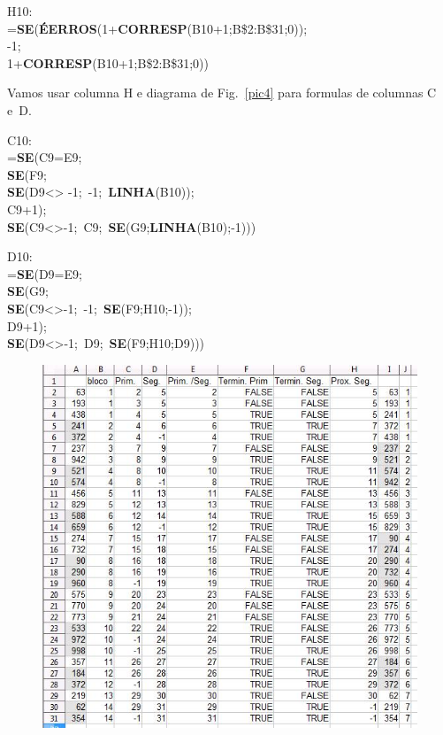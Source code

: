 \documentclass[12pt]{article}
\begin{document}
\noindent
H10:\\
=\textbf{SE}(\textbf{\'EERROS}(1+\textbf{CORRESP}(B10+1;B\$2:B\$31;0));\\
-1;\\
1+\textbf{CORRESP}(B10+1;B\$2:B\$31;0))

Vamos usar columna H e diagrama de Fig.~\ref{pic4} para formulas
de columnas C e~D.

\noindent
C10:\\
=\textbf{SE}(C9=E9;\\
\textbf{SE}(F9;\\
\textbf{SE}(D9\textless\textgreater
-1;\, -1;\, \textbf{LINHA}(B10));\\
C9+1);\\
 \textbf{SE}(C9\textless\textgreater -1;\,
C9;\, \textbf{SE}(G9;\textbf{LINHA}(B10);-1)))

\noindent
D10:\\
=\textbf{SE}(D9=E9;\\
\textbf{SE}(G9;\\
\textbf{SE}(C9\textless\textgreater -1;\, -1;\,
\textbf{SE}(F9;H10;-1));\\
D9+1);\\
 \textbf{SE}(D9\textless\textgreater -1;\,
D9;\, \textbf{SE}(F9;H10;D9)))

\begin{figure}[htb]
\begin{center}
\includegraphics{./imgs/pic5}
\end{center}
\caption{}\label{pic5}
\end{figure}
\end{document}
